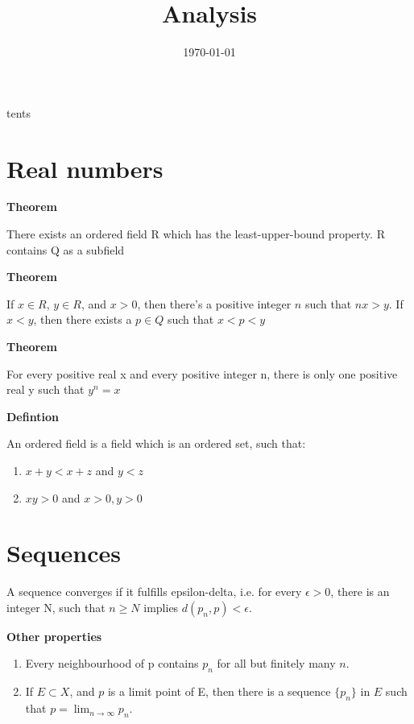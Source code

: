 \documentclass[11pt]{article}
\date{\today}
\title{Analysis}
\begin{document}
\maketitle
\tableofcon
tents


\section{Real numbers}
\label{sec:org3c858df}

\textbf{Theorem}

There exists an ordered field R which has the least-upper-bound property. R contains Q as a subfield


\textbf{Theorem}

\begin{defff}
If \(x \in R\), \(y \in R\), and \(x > 0\), then there's a positive integer \(n\) such that \(nx > y\).
If \(x < y\), then there exists a \(p \in Q\) such that \(x < p < y\)
\end{defff}

\textbf{Theorem}

For every positive real x and every positive integer n, there is only one positive real y such that \(y^n = x\)

\textbf{Defintion}

An ordered field is a field which is an ordered set, such that:

\begin{enumerate}
\item \(x + y < x + z\) and  \(y < z\)
\item \(xy > 0\) and \(x > 0, y > 0\)
\end{enumerate}

\section{Sequences}
\label{sec:orgddaf8c1}

A sequence converges if it fulfills epsilon-delta, i.e. for every \(\epsilon > 0\), there is an integer N, such that \(n \geq N\) implies \(d(p_n,p) < \epsilon\).

\textbf{Other properties}

\begin{enumerate}
\item Every neighbourhood of p contains \(p_n\) for all but finitely many \(n\).
\item If \(E \subset X\), and \(p\) is a limit point of E, then there is a sequence \(\{p_n\}\) in \(E\) such that \(p = \lim_{n\to\infty} p_n\).
\end{enumerate}
\end{document}
